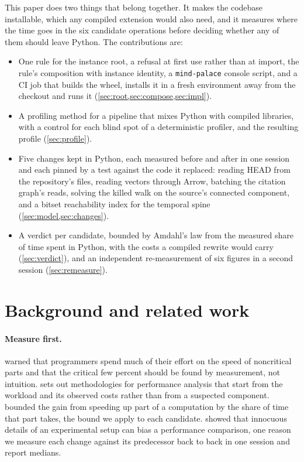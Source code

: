 \documentclass[11pt]{article}
\theoremstyle{plain}
\theoremstyle{definition}
\theoremstyle{remark}
\begin{document}
This paper does two things that belong together. It makes the codebase installable, which any
compiled extension would also need, and it measures where the time goes in the six candidate
operations before deciding whether any of them should leave Python. The contributions are:
\begin{itemize}
\item One rule for the instance root, a refusal at first use rather than at import, the rule's
  composition with instance identity, a \texttt{mind-palace} console script, and a CI job that
  builds the wheel, installs it in a fresh environment away from the checkout and runs it
  (\cref{sec:root,sec:compose,sec:impl}).
\item A profiling method for a pipeline that mixes Python with compiled libraries, with a control
  for each blind spot of a deterministic profiler, and the resulting profile (\cref{sec:profile}).
\item Five changes kept in Python, each measured before and after in one session and each pinned
  by a test against the code it replaced: reading HEAD from the repository's files, reading vectors
  through Arrow, batching the citation graph's reads, solving the killed walk on the source's
  connected component, and a bitset reachability index for the temporal spine
  (\cref{sec:model,sec:changes}).
\item A verdict per candidate, bounded by Amdahl's law from the measured share of time spent in
  Python, with the costs a compiled rewrite would carry (\cref{sec:verdict}), and an independent
  re-measurement of six figures in a second session (\cref{sec:remeasure}).
\end{itemize}

\section{Background and related work}

\paragraph{Measure first.} \citet{knuth1974} warned that programmers spend much of their effort
on the speed of noncritical parts and that the critical few percent should be found by measurement,
not intuition. \citet{gregg2020} sets out methodologies for performance analysis that start from
the workload and its observed costs rather than from a suspected component. \citet{amdahl1967}
bounded the gain from speeding up part of a computation by the share of time that part takes, the
bound we apply to each candidate. \citet{mytkowicz2009} showed that innocuous details of an
experimental setup can bias a performance comparison, one reason we measure each change against its
predecessor back to back in one session and report medians.
\end{document}
